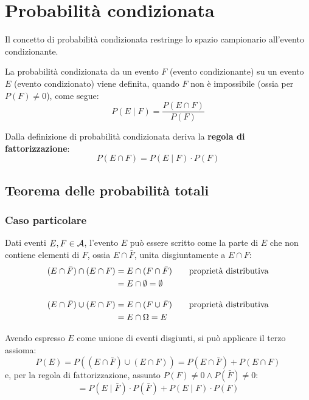 \section{Probabilità condizionata}
Il concetto di probabilità condizionata restringe lo spazio campionario all'evento condizionante.

\begin{defin}
	La probabilità condizionata da un evento $F$ (evento condizionante) su un evento $E$ (evento condizionato) viene definita, quando $F$ non è impossibile (ossia per $P(F)\neq 0$), come segue:
	\begin{equation*}
		P(E\mid F)=\frac{P(E \cap F)}{P(F)}
	\end{equation*}
\end{defin}

Dalla definizione di probabilità condizionata deriva la \textbf{regola di fattorizzazione}:
\begin{equation}
	P(E \cap F)=P(E\mid F)\cdot P(F)
\end{equation}



\subsection{Teorema delle probabilità totali}

\subsubsection{Caso particolare}
Dati eventi $E, F\in \mathcal A$, l'evento $E$ può essere scritto come la parte di $E$ che non contiene elementi di $F$, ossia $E\cap \bar F$, unita disgiuntamente a $E \cap F$:
\begin{align*}
	(E \cap \bar F) \cap (E \cap F) & = E \cap (F \cap \bar F)& \quad & \text{proprietà distributiva}  \\
	                                & = E \cap \emptyset = \emptyset                       \\[2ex]
	(E \cap \bar F) \cup (E \cap F) & = E \cap (F \cup \bar F) & \quad & \text{proprietà distributiva} \\
	                                & = E \cap \Omega = E
\end{align*}

Avendo espresso $E$ come unione di eventi disgiunti, si può applicare il terzo assioma:
\begin{equation*}
	P(E) = P((E \cap \bar F)\cup(E \cap F)) = P(E \cap \bar F)+P(E \cap F)
\end{equation*}
e, per la regola di fattorizzazione, assunto $P(F)\neq 0 \land P(\bar F)\neq 0$:
\begin{equation*}
	=P(E\mid \bar F)\cdot P(\bar F) + P(E \mid F)\cdot P(F)
\end{equation*}


